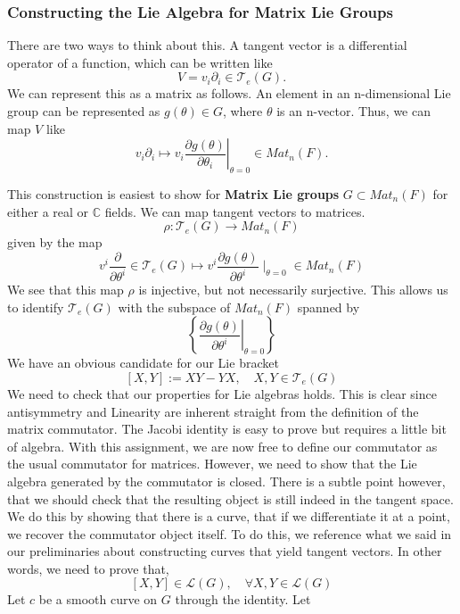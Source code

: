 \documentclass[11pt, oneside]{article}   	%
\theoremstyle{slanted}
\begin{document}
\subsubsection{Constructing the Lie Algebra for Matrix Lie Groups} 
There are two ways to think about this. A tangent vector is a differential operator of a function, which can be written like 
\[ 
	V = v_i \partial_i \in \mathcal{T}_e(G). 
\] 
We can represent this as a matrix as follows. An element in an n-dimensional Lie group can be represented as $g(\theta) \in G$, where $\theta$ is an n-vector. Thus, we can map $V$ like 
\[
 	v_i \partial_i \mapsto \left. v_i \frac{\partial g(\theta)}{\partial \theta_i} \right\vert_{\theta = 0} \in Mat_n(F). 
\]

This construction is easiest to show for \textbf{Matrix Lie groups} $ G \subset Mat_n ( F) $ for either a real or $\mathbb{C} $ fields. We can 
map tangent vectors to matrices. 
\[
	\rho : \mathcal{ T}_{ e }( G ) \to Mat_n ( F)
\] given by the map 
\[
v^{ i }\frac{\partial }{\partial \theta^{ i  } } \in \mathcal{ T }_e ( G ) \mapsto v^{ i } \frac{\partial  g ( \theta ) }{\partial \theta^{ i }} \mid_{ \theta = 0 } \in Mat_n ( F)  
\] We see that this map $\rho $ is injective, but not necessarily 
surjective. 
This allows us to identify $ \mathcal{ T }_{ e }( G ) $ with 
the subspace of $ Mat_n ( F ) $ spanned by 
\[
\left\{ \left. \frac{\partial  g ( \theta ) }{\partial \theta^{ i } } \right \vert_{ \theta = 0 }   \right\} 
\] We have an obvious candidate for our Lie bracket 
\[
[ X, Y ] := XY - Y X, \quad X, Y \in \mathcal{ T }_e ( G ) 
\] We need to check that our properties for Lie 
algebras holds. This is clear since antisymmetry and Linearity are inherent 
straight from the definition of the matrix commutator. 
The Jacobi identity is easy to prove but requires a little bit of algebra. 
With this assignment, we are now free to define our commutator as the usual commutator for matrices. 
However, we need to show that the Lie algebra generated by the commutator is closed. 
There is a subtle point however, that we should check that the resulting object is still indeed in the tangent space. We do this by showing that there is a curve, that if we differentiate it at a point, we recover the commutator object itself. To do this, we reference what we said in our preliminaries about constructing curves that yield tangent vectors. 
In other words, we need to prove that, 
\[
[ X, Y ] \in \mathcal{ L } ( G ), \quad \forall X, Y \in \mathcal{ L }( G ) 
\] Let $ c $ be a smooth curve on $ G $ through the 
identity. Let 
\end{document}
